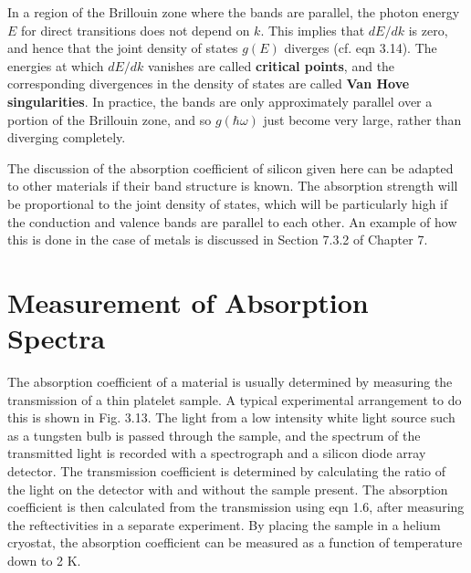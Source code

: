 \documentclass[12pt]{book}
\begin{document}

In a region of the Brillouin zone where the bands are parallel, the photon energy $E$ for direct transitions does not depend on $k$. This implies that $dE/dk$ is zero, and hence that the joint density of states $g(E)$ diverges (cf. eqn 3.14). The energies at which $dE /dk$ vanishes are called \textbf{critical points}, and the corresponding divergences in the density of states are called \textbf{Van Hove singularities}. In practice, the bands are only approximately parallel over a portion of the Brillouin zone, and so $g(\hbar\omega)$ just become very large, rather than diverging completely.

The discussion of the absorption coefficient of silicon given here can be adapted to other materials if their band structure is known. The absorption strength will be proportional to the joint density of states, which will be particularly high if the conduction and valence bands are parallel to each other. An example of how this is done in the case of metals is discussed in Section 7.3.2 of Chapter 7.

\section{Measurement of Absorption Spectra}

The absorption coefficient of a material is usually determined by measuring the transmission of a thin platelet sample. A typical experimental arrangement to do this is shown in Fig. 3.13. The light from a low intensity white light source such as a tungsten bulb is passed through the sample, and the spectrum of the transmitted light is recorded with a spectrograph and a silicon diode array detector. The transmission coefficient is determined by calculating the ratio of the light on the detector with and without the sample present. The absorption coefficient is then calculated from the transmission using eqn 1.6, after measuring the reftectivities in a separate experiment. By placing the sample in a helium cryostat, the absorption coefficient can be measured as a function of temperature down to 2 K.
\end{document}
